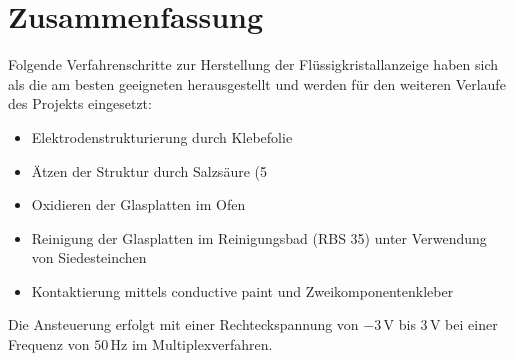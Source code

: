 \section{Zusammenfassung}

Folgende Verfahrenschritte zur Herstellung der Flüssigkristallanzeige haben sich als die am besten geeigneten herausgestellt und werden für den weiteren Verlaufe des Projekts eingesetzt:

\begin{itemize}
\item Elektrodenstrukturierung durch Klebefolie
\item Ätzen der Struktur durch Salzsäure (5%
\item Oxidieren der Glasplatten im Ofen
\item Reinigung der Glasplatten im Reinigungsbad (RBS 35) unter Verwendung von Siedesteinchen
\item Kontaktierung mittels conductive paint und Zweikomponentenkleber\\
\end{itemize}

Die Ansteuerung erfolgt mit
einer Rechteckspannung von \(-3\,\textrm{V}\) bis \(3\,\textrm{V}\)
bei einer Frequenz von \(50\,\textrm{Hz}\) im
Multiplexverfahren.